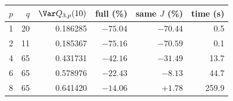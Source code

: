\begin{tabular}{rrrrrr}\toprule
$p$ & $q$ & $\Var Q_{3,p}(10)$ & full (\%) & same $J$ (\%) & time (s)\\\midrule
1 & 20 & 0.186285 & $-75.04$ & $-70.44$ & 0.5\\
2 & 11 & 0.185367 & $-75.16$ & $-70.59$ & 0.1\\
4 & 65 & 0.431731 & $-42.16$ & $-31.49$ & 13.7\\
6 & 65 & 0.578976 & $-22.43$ & $-8.13$ & 44.7\\
8 & 65 & 0.641420 & $-14.06$ & $+1.78$ & 259.9\\
\bottomrule\end{tabular}
